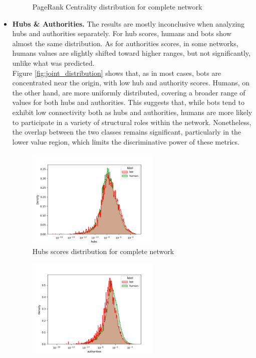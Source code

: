 \documentclass[12pt, a4paper]{article}
\begin{document}
\begin{itemize}
\begin{figure}[H]
                    \caption{PageRank Centrality distribution for complete network}
                \end{figure}
            \item \textbf{Hubs \& Authorities.} The results are mostly inconclusive when analyzing hubs and authorities separately. For hub scores, humans and bots show almost the same distribution. As for authorities scores, in some networks, humans values are slightly shifted toward higher ranges, but not significantly, unlike what was predicted.\\
            	Figure \ref{fig:joint_distribution} shows that, as in most cases, bots are concentrated near the origin, with low hub and authority scores. Humans, on the other hand, are more uniformly distributed, covering a broader range of values for both hubs and authorities. This suggests that, while bots tend to exhibit low connectivity both as hubs and authorities, humans are more likely to participate in a variety of structural roles within the network. Nonetheless, the overlap between the two classes remains significant, particularly in the lower value region, which limits the discriminative power of these metrics.
                \begin{figure}[H]
                    \centering
                    \includegraphics[width=0.6\textwidth]{complete_hubs_distribution.png}
                    \caption{Hubs scores distribution for complete network}
                \end{figure}
                \begin{figure}[H]
                    \centering
                    \includegraphics[width=0.6\textwidth]{complete_authorities_distribution.png}

\end{figure}
\end{itemize}
\end{document}
